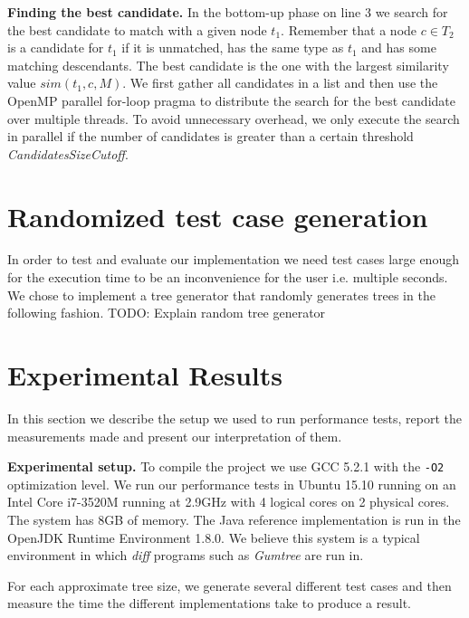 \documentclass[letterpaper]{article}
\newcommand{\mypar}[1]{{\bf #1.}}
\begin{document}
\mypar{Finding the best candidate}
In the bottom-up phase on line 3 we search for the best candidate to match with a given node $t_1$.
Remember that a node $c \in T_2$ is a candidate for $t_1$ if it is unmatched, has the same type as $t_1$ and has some matching descendants.
The best candidate is the one with the largest similarity value $sim(t_1,c,M)$.
We first gather all candidates in a list and then use the OpenMP parallel for-loop pragma to distribute the search for the best candidate over multiple threads.
To avoid unnecessary overhead, we only execute the search in parallel if the number of candidates is greater than a certain threshold \emph{CandidatesSizeCutoff}.

\section{Randomized test case generation}

In order to test and evaluate our implementation we need test cases large enough for the execution time to be an inconvenience for the user i.e. multiple seconds.
We chose to implement a tree generator that randomly generates trees in the following fashion.
TODO: Explain random tree generator

\section{Experimental Results}\label{sec:exp}

In this section we describe the setup we used to run performance tests, report the measurements made and present our interpretation of them.

\mypar{Experimental setup}
To compile the project we use GCC 5.2.1 with the \texttt{-O2} optimization level.
We run our performance tests in Ubuntu 15.10 running on an Intel Core i7-3520M running at 2.9GHz with 4 logical cores on 2 physical cores.
The system has 8GB of memory.
The Java reference implementation is run in the OpenJDK Runtime Environment 1.8.0.
We believe this system is a typical environment in which \emph{diff} programs such as \emph{Gumtree} are run in.

For each approximate tree size, we generate several different test cases and then measure the time the different implementations take to produce a result.
\end{document}
